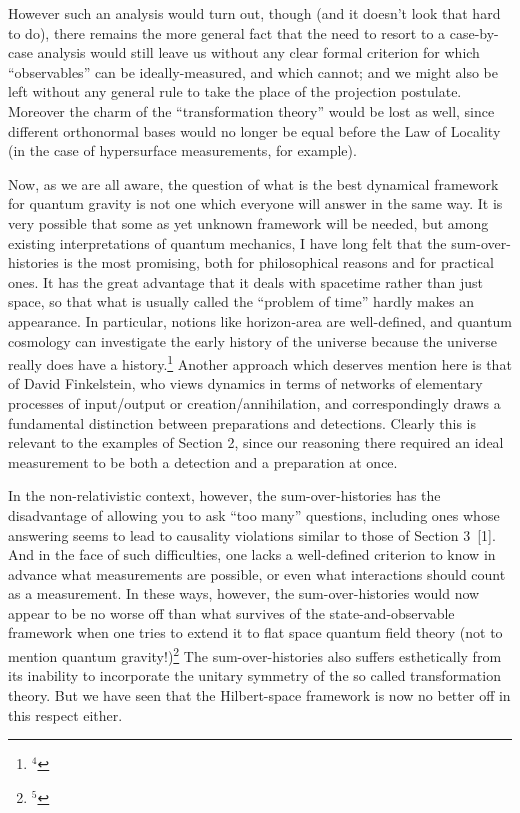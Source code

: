 \tx
However such an analysis would turn out, though (and it doesn't look
that hard to do), there remains the more general fact that
the need to resort to a case-by-case analysis would still leave us
without
 any clear formal criterion for which
``observables'' can be ideally-measured, and which cannot; and we
might also be left without any general rule to take the place of the
projection postulate.  Moreover the charm of the ``transformation
theory'' would be lost as well, since different orthonormal bases would
no longer be equal before the Law of Locality (in the case of
hypersurface measurements, for example).

\tx
Now, as we are all aware, the question of what is the best dynamical
framework for quantum gravity is not one which everyone will answer in
the same way.  It is very possible that some as yet unknown framework
will be needed, but among existing interpretations of quantum
mechanics, I have long felt that the sum-over-histories is the most
promising, both for philosophical reasons and for practical ones.  It
has the great advantage that it deals with spacetime rather than just
space, so that what is usually called the ``problem of time'' hardly
makes an appearance.  In particular, notions like horizon-area are
well-defined, and quantum cosmology can investigate the early history
of the universe because the universe really does have a
history.\footnote{$^4$}
%
{Another approach which deserves mention here is that of David
Finkelstein, who views dynamics in terms of networks of elementary
processes of input/output or creation/annihilation, and
correspondingly draws a fundamental distinction between preparations
and detections.  Clearly this is relevant to the examples of Section
2, since our reasoning there required an ideal measurement to be both
a detection and a preparation at once. \smallskip}

\tx
In the non-relativistic context, however, the sum-over-histories has
the disadvantage of allowing you to ask ``too many'' questions,
including ones whose answering seems to lead to causality violations
similar to those of Section 3~[1].  And in the face of such difficulties,
one lacks a well-defined criterion to know in advance what
measurements are possible, or even what interactions should count as a
measurement.  In these ways, however, the sum-over-histories would now
appear to be no worse off than what survives of the
state-and-observable framework when one tries to extend it to flat
space quantum field theory (not to mention quantum
gravity!)\footnote{$^5$}
%
{The sum-over-histories also suffers esthetically from its inability
to incorporate the unitary symmetry of the so called transformation
theory.  But we have seen that the Hilbert-space framework is now no
better off in this respect either.}


